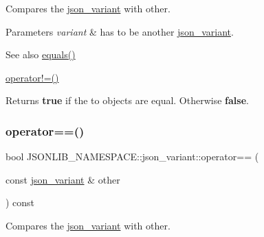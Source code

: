 Compares the \hyperlink{classJSONLIB__NAMESPACE_1_1json__variant}{json\+\_\+variant} with {\ttfamily other}. 


\begin{DoxyParams}{Parameters}
{\em variant} & has to be another \hyperlink{classJSONLIB__NAMESPACE_1_1json__variant}{json\+\_\+variant}. \\
\hline
\end{DoxyParams}
\begin{DoxySeeAlso}{See also}
\hyperlink{classJSONLIB__NAMESPACE_1_1json__variant_ae68b9cb156c2b2f9e12c7f889634b63a}{equals()} 

\hyperlink{classJSONLIB__NAMESPACE_1_1json__variant_a7672a255983f3142523b3680e737d021}{operator!=()} 
\end{DoxySeeAlso}
\begin{DoxyReturn}{Returns}
{\bfseries true} if the to objects are equal. Otherwise {\bfseries false}. 
\end{DoxyReturn}
\mbox{\label{classJSONLIB__NAMESPACE_1_1json__variant_aef1fc1a342cc170da06e0d3eb1299aad}} 
\subsubsection{\texorpdfstring{operator==()}{operator==()}\hspace{0.1cm}{\footnotesize\ttfamily [2/2]}}
{\footnotesize\ttfamily bool J\+S\+O\+N\+L\+I\+B\+\_\+\+N\+A\+M\+E\+S\+P\+A\+C\+E\+::json\+\_\+variant\+::operator== (\begin{DoxyParamCaption}\item[{const \hyperlink{classJSONLIB__NAMESPACE_1_1json__variant}{json\+\_\+variant} \&}]{other }\end{DoxyParamCaption}) const\hspace{0.3cm}{\ttfamily [inline]}}



Compares the \hyperlink{classJSONLIB__NAMESPACE_1_1json__variant}{json\+\_\+variant} with {\ttfamily other}. 



